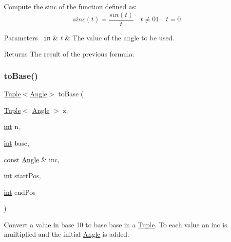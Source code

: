 Compute the sinc of the function defined as\+: \[ sinc(t)=\frac{sin(t)}{t}\quad t\neq 0 1\quad t=0 \] 
\begin{DoxyParams}[1]{Parameters}
\mbox{\texttt{ in}}  & {\em t} & The value of the angle to be used. \\
\hline
\end{DoxyParams}
\begin{DoxyReturn}{Returns}
The result of the previous formula. 
\end{DoxyReturn}
\mbox{\label{dubins_8hh_a24a357b93081a0180dfec16136bc8ff7}} 
\subsubsection{\texorpdfstring{toBase()}{toBase()}}
{\footnotesize\ttfamily \mbox{\hyperlink{class_tuple}{Tuple}}$<$\mbox{\hyperlink{class_angle}{Angle}}$>$ to\+Base (\begin{DoxyParamCaption}\item[{\mbox{\hyperlink{class_tuple}{Tuple}}$<$ \mbox{\hyperlink{class_angle}{Angle}} $>$}]{z,  }\item[{\mbox{\hyperlink{draw_8hh_aa620a13339ac3a1177c86edc549fda9b}{int}}}]{n,  }\item[{\mbox{\hyperlink{draw_8hh_aa620a13339ac3a1177c86edc549fda9b}{int}}}]{base,  }\item[{const \mbox{\hyperlink{class_angle}{Angle}} \&}]{inc,  }\item[{\mbox{\hyperlink{draw_8hh_aa620a13339ac3a1177c86edc549fda9b}{int}}}]{start\+Pos,  }\item[{\mbox{\hyperlink{draw_8hh_aa620a13339ac3a1177c86edc549fda9b}{int}}}]{end\+Pos }\end{DoxyParamCaption})}



Convert a value in base 10 to base {\ttfamily base} in a {\ttfamily \mbox{\hyperlink{class_tuple}{Tuple}}}. To each value an inc is muiltiplied and the initial {\ttfamily \mbox{\hyperlink{class_angle}{Angle}}} is added. 


